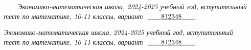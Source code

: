\begin{flushleft}
	{{\it{$\qquad$Экономико-математическая школа, 2024-2025 учебный год, вступительный тест по математике, 10-11 классы, вариант  $\;\underline{\qquad812348\qquad}$}}}
\end{flushleft}

\begin{enumerate}
	\begin{minipage}{0.6\textwidth}
        \vspace{0pt}
        
    \end{minipage}
    \hfill
    \begin{minipage}{0.6\textwidth}
        \vspace{0pt}
        
    \end{minipage}

\newpage
\begin{flushleft}
    {{\it{Экономико-математическая школа, 2024-2025 учебный год, вступительный тест по математике, 10-11 классы, вариант  $\;\underline{\qquad812348\qquad}$}}}
\end{flushleft}

\begin{minipage}[t]{0.6\textwidth}
    \vspace{0pt}
    
\end{minipage}
\hfill
\begin{minipage}[t]{0.6\textwidth}
    \vspace{0pt}
    
\end{minipage}

\end{enumerate}
